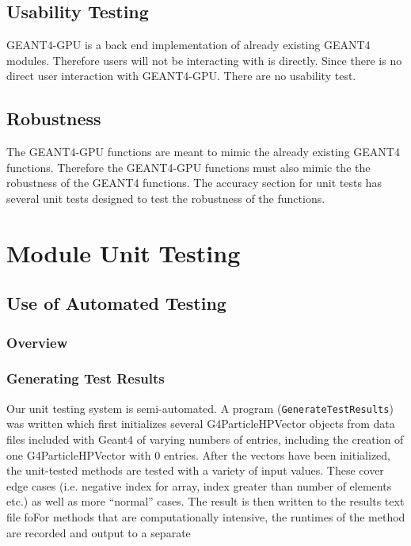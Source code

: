 \documentclass[12pt]{article}
\begin{document}
\subsection{Usability Testing}
GEANT4-GPU is a back end implementation of already existing GEANT4 modules. Therefore users will not be interacting with is directly. Since there is no direct user interaction with GEANT4-GPU. There are no usability test. 
\subsection{Robustness}
The GEANT4-GPU functions are meant to mimic the already existing GEANT4 functions. Therefore the GEANT4-GPU functions must also mimic the the robustness of the GEANT4 functions. The accuracy section for unit tests has several unit tests designed to test the robustness of the functions. 

\newpage
\section{Module Unit Testing}
\subsection{Use of Automated Testing}
\subsubsection{Overview}

\subsubsection{Generating Test Results}
Our unit testing system is semi-automated. A program (\texttt{GenerateTestResults}) was written which first initializes several G4ParticleHPVector objects from data files included with Geant4 of varying numbers of entries, including the creation of one G4ParticleHPVector with 0 entries. After the vectors have been initialized, the unit-tested methods are tested with a variety of input values. These cover edge cases (i.e. negative index for array, index greater than number of elements etc.) as well as more ``normal'' cases. The result is then written to the results text file foFor methods that are computationally intensive, the runtimes of the method are recorded and output to a separate
\end{document}
